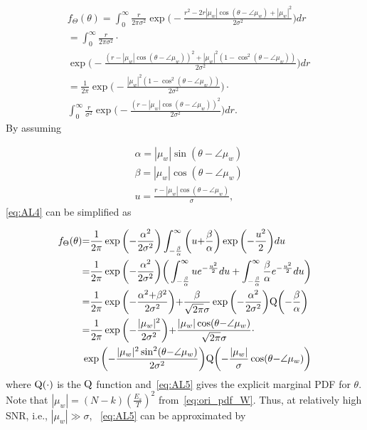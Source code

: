 \begin{appendices}
\begin{equation}
    \label{eq:AL4}
    \begin{aligned}
    &f_\Theta(\theta) {=}\int_{0}^{\infty}\frac{r}{2\pi  \sigma^2}\exp\bigg({-}\frac{r^2{-}2r|\mu_w|\cos(\theta{-}\angle\mu_w){+}|\mu_w|^2}{2\sigma^2}\bigg)dr \\
    &{=}\int_{0}^{\infty}\frac{r}{2\pi\sigma^2} \cdot\\
    &\exp\bigg({-}\frac{(r{-}|\mu_w|\cos(\theta{-}\angle{\mu_w}))^2{+}|\mu_w|^2(1{-}\cos^2(\theta{-}\angle\mu_w))}{2\sigma^2}\bigg)dr \\
    &{=}\frac{1}{2\pi}\exp\bigg({-}\frac{|\mu_w|^2(1{-}\cos^2(\theta-\angle\mu_w))}{2\sigma^2}\bigg) \cdot \\
    &\int_{0}^{\infty}\frac{r}{\sigma^2}\exp\bigg({-}\frac{(r{-}|\mu_w|\cos(\theta{-}\angle{\mu_w}))^2}{2\sigma^
    2}\bigg)dr.
    \end{aligned}
\end{equation}
By assuming

\begin{equation*}
\begin{aligned}
    &\alpha{=}|\mu_w|\sin(\theta{-}\angle\mu_w) \\
    &\beta{=}|\mu_w|\cos(\theta{-}\angle\mu_w) \\
    &u{=}\frac{r{-}|\mu_w|\cos(\theta{-}\angle\mu_w)}{\sigma},
    \end{aligned}
\end{equation*}
\eqref{eq:AL4} can be simplified as

\begin{equation}
    \label{eq:AL5}
    \begin{aligned}
    f_\Theta(\theta) &{=}\frac{1}{2\pi}\exp\bigg({-}\frac{\alpha^2}{2\sigma^2}\bigg)\int_{{-}\frac{\beta}{\alpha}}^{\infty}\bigg(u{+}\frac{\beta}{\alpha}\bigg)\exp\bigg({-}\frac{u^2}{2}\bigg)du \\
    &{=}\frac{1}{2\pi}\exp\bigg({-}\frac{\alpha^2}{2\sigma^2}\bigg)\bigg(\int_{{-}\frac{\beta}{\alpha}}^{\infty}ue^{{-}\frac{u^2}{2}}du+\int_{{-}\frac{\beta}{\alpha}}^{\infty}\frac{\beta}{\alpha}e^{{-}\frac{u^2}{2}}du\bigg) \\
    &{=}\frac{1}{2\pi}\exp\bigg({-}\frac{\alpha^2{+}\beta^2}{2\sigma^2}\bigg){+}\frac{\beta}{\sqrt{2\pi}\sigma}\exp\bigg({-}\frac{\alpha^2}{2\sigma^2}\bigg)\mathrm{Q}\bigg({-}\frac{\beta}{\alpha}\bigg) \\
    &{=}\frac{1}{2\pi}\exp\bigg({-}\frac{|\mu_w|^2}{2\sigma^2}\bigg){+}\frac{|\mu_w|\cos(\theta{-}\angle\mu_w)}{\sqrt{2\pi}\sigma} \cdot \\
    &\exp\bigg({-}\frac{|\mu_w|^2\sin^2(\theta{-}\angle\mu_w)}{2\sigma^2}\bigg)\mathrm{Q}\bigg({-}\frac{|\mu_w|}{\sigma}\cos(\theta{-}\angle\mu_w)\bigg)
    \end{aligned}
\end{equation}
where $\mathrm{Q}(\cdot)$ is the $\mathrm{Q}$ function and~\eqref{eq:AL5} gives the explicit 
mar\-ginal PDF for $\theta$. Note that $|\mu_w|=(N-k)(\frac{E_s}{T})^2$ 
from~\eqref{eq:ori_pdf_W}. Thus, at relatively high SNR, i.e., $|\mu_w|\gg\sigma$,
~\eqref{eq:AL5} can be approximated by


\end{appendices}

